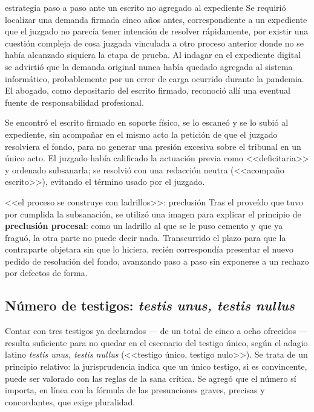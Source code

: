 \documentclass[12pt,oneside]{book}
\begin{document}
\begin{example}{estrategia paso a paso ante un escrito no agregado al expediente}
Se requirió localizar una demanda firmada cinco años antes, correspondiente a un expediente que el juzgado no parecía tener intención de resolver rápidamente, por existir una cuestión compleja de cosa juzgada vinculada a otro proceso anterior donde no se había alcanzado siquiera la etapa de prueba. Al indagar en el expediente digital se advirtió que la demanda original nunca había quedado agregada al sistema informático, probablemente por un error de carga ocurrido durante la pandemia. El abogado, como depositario del escrito firmado, reconoció allí una eventual fuente de responsabilidad profesional.

Se encontró el escrito firmado en soporte físico, se lo escaneó y se lo subió al expediente, sin acompañar en el mismo acto la petición de que el juzgado resolviera el fondo, para no generar una presión excesiva sobre el tribunal en un único acto. El juzgado había calificado la actuación previa como <<deficitaria>> y ordenado subsanarla; se resolvió con una redacción neutra (<<acompaño escrito>>), evitando el término usado por el juzgado.
\end{example}

\begin{example}{<<el proceso se construye con ladrillos>>: preclusión}
Tras el proveído que tuvo por cumplida la subsanación, se utilizó una imagen para explicar el principio de \textbf{preclusión procesal}: como un ladrillo al que se le puso cemento y que ya fraguó, la otra parte no puede decir nada. Transcurrido el plazo para que la contraparte objetara sin que lo hiciera, recién correspondía presentar el nuevo pedido de resolución del fondo, avanzando paso a paso sin exponerse a un rechazo por defectos de forma.
\end{example}

\subsection{Número de testigos: \textit{testis unus, testis nullus}}

Contar con tres testigos ya declarados --- de un total de cinco a ocho ofrecidos --- resulta suficiente para no quedar en el escenario del testigo único, según el adagio latino \textit{testis unus, testis nullus} (<<testigo único, testigo nulo>>). Se trata de un principio relativo: la jurisprudencia indica que un único testigo, si es convincente, puede ser valorado con las reglas de la sana crítica. Se agregó que el número sí importa, en línea con la fórmula de las presunciones graves, precisas y concordantes, que exige pluralidad.
\end{document}
